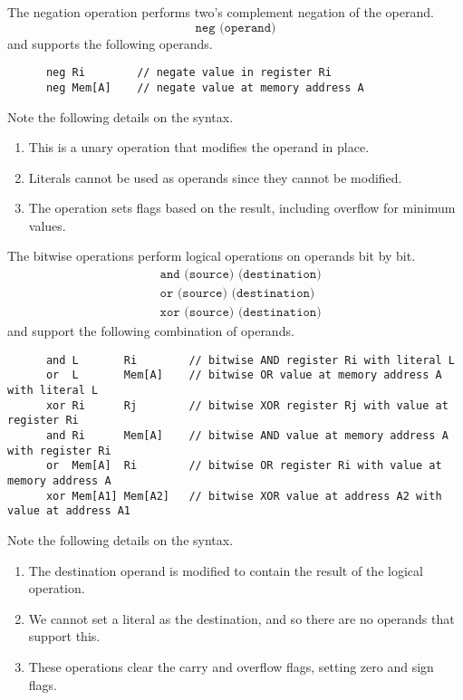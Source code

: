  \begin{definition}[Negation]
    The negation operation performs two's complement negation of the operand.
    \begin{equation}
      \texttt{neg (operand)}
    \end{equation}
    and supports the following operands.
    \begin{lstlisting}
      neg Ri        // negate value in register Ri
      neg Mem[A]    // negate value at memory address A
    \end{lstlisting}
    Note the following details on the syntax.
    \begin{enumerate}
      \item This is a unary operation that modifies the operand in place.
      \item Literals cannot be used as operands since they cannot be modified.
      \item The operation sets flags based on the result, including overflow for minimum values.
    \end{enumerate}
  \end{definition}

  \begin{definition}
    The bitwise operations perform logical operations on operands bit by bit.
    \begin{align*}
      & \texttt{and (source) (destination)} \\ 
      & \texttt{or (source) (destination)} \\
      & \texttt{xor (source) (destination)}
    \end{align*}
    and support the following combination of operands.
    \begin{lstlisting}
      and L       Ri        // bitwise AND register Ri with literal L
      or  L       Mem[A]    // bitwise OR value at memory address A with literal L
      xor Ri      Rj        // bitwise XOR register Rj with value at register Ri
      and Ri      Mem[A]    // bitwise AND value at memory address A with register Ri
      or  Mem[A]  Ri        // bitwise OR register Ri with value at memory address A
      xor Mem[A1] Mem[A2]   // bitwise XOR value at address A2 with value at address A1
    \end{lstlisting}
    Note the following details on the syntax.
    \begin{enumerate}
      \item The destination operand is modified to contain the result of the logical operation.
      \item We cannot set a literal as the destination, and so there are no operands that support this.
      \item These operations clear the carry and overflow flags, setting zero and sign flags.
    \end{enumerate}
  \end{definition}


